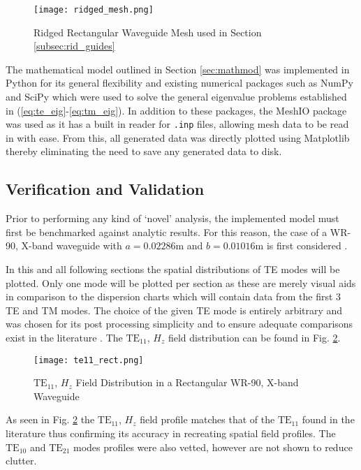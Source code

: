\begin{figure}[h!]  
	\centering
	\texttt{[image: ridged\_mesh.png]} 
	\caption{Ridged Rectangular Waveguide Mesh used in Section \ref{subsec:rid_guides}}
	\label{fig:ridged_guide}
\end{figure}

The mathematical model outlined in Section \ref{sec:mathmod} was implemented in Python for its general flexibility and existing numerical packages such as NumPy and SciPy which were used to solve the general eigenvalue problems established in (\ref{eq:te_eig}-\ref{eq:tm_eig}). In addition to these packages, the MeshIO package was used as it has a built in reader for \verb|.inp| files, allowing mesh data to be read in with ease. From this, all generated data was directly plotted using Matplotlib thereby eliminating the need to save any generated data to disk.

\subsection{Verification and Validation}
\label{subsec:vv}
Prior to performing any kind of `novel' analysis, the implemented model must first be benchmarked against analytic results. For this reason, the case of a WR-90, X-band waveguide with $a=0.02286$m and $b=0.01016$m is first considered \cite{everythingrf}. 

In this and all following sections the spatial distributions of TE modes will be plotted. Only one mode will be plotted per section as these are merely visual aids in comparison to the dispersion charts which will contain data from the first 3 TE and TM modes. The choice of the given TE mode is entirely arbitrary and was chosen for its post processing simplicity and to ensure adequate comparisons exist in the literature \cite{pozar2011microwave}. The $\mathrm{TE}_{11}$, $H_z$ field distribution can be found in Fig. \ref{fig:rect_prof}. 

\begin{figure}[h!]  
	\centering
	\texttt{[image: te11\_rect.png]} 
	\caption{$\mathrm{TE_{11}}$, $H_z$ Field Distribution in a Rectangular WR-90, X-band Waveguide}
	\label{fig:rect_prof}
\end{figure}

As seen in Fig. \ref{fig:rect_prof} the $\mathrm{TE_{11}}$, $H_z$ field profile matches that of the $\mathrm{TE}_{11}$ found in the literature \cite{pozar2011microwave} thus confirming its accuracy in recreating spatial field profiles. The $\mathrm{TE}_{10}$ and $\mathrm{TE}_{21}$ modes profiles were also vetted, however are not shown to reduce clutter.

